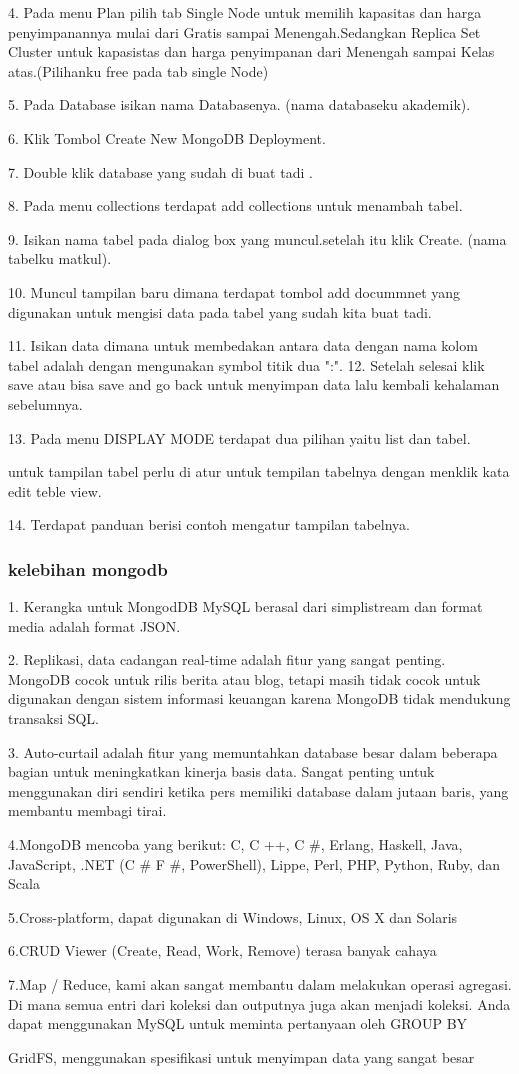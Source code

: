 4. Pada menu Plan pilih tab Single Node untuk memilih kapasitas dan harga penyimpanannya mulai dari Gratis sampai Menengah.Sedangkan Replica Set Cluster untuk kapasistas dan harga penyimpanan dari Menengah sampai Kelas atas.(Pilihanku free pada tab single Node)

5. Pada Database isikan nama Databasenya. (nama databaseku akademik).

6. Klik Tombol Create New MongoDB Deployment.

7. Double klik database yang sudah di buat tadi .

8. Pada menu collections terdapat add collections untuk menambah tabel.

9. Isikan nama tabel pada dialog box yang muncul.setelah itu klik Create. (nama tabelku matkul).

10. Muncul tampilan baru dimana terdapat tombol add docummnet yang digunakan untuk mengisi data pada tabel yang sudah kita buat tadi.

11. Isikan data dimana untuk membedakan antara data dengan nama kolom tabel adalah dengan mengunakan symbol titik dua ":".
12. Setelah selesai klik save atau bisa save and go back untuk menyimpan data lalu kembali kehalaman sebelumnya.

13. Pada menu DISPLAY MODE terdapat dua pilihan yaitu list dan tabel. 

untuk tampilan tabel perlu di atur untuk tempilan tabelnya dengan menklik kata edit teble view.

14. Terdapat panduan berisi contoh mengatur tampilan tabelnya.

\subsubsection {kelebihan mongodb}

1. Kerangka untuk MongodDB MySQL berasal dari simplistream dan format media adalah format JSON.

2. Replikasi, data cadangan real-time adalah fitur yang sangat penting. MongoDB cocok untuk rilis berita atau blog, tetapi masih tidak cocok untuk digunakan dengan sistem informasi keuangan karena MongoDB tidak mendukung transaksi SQL.

3. Auto-curtail adalah fitur yang memuntahkan database besar dalam beberapa bagian untuk meningkatkan kinerja basis data. Sangat penting untuk menggunakan diri sendiri ketika pers memiliki database dalam jutaan baris, yang membantu membagi tirai.

4.MongoDB mencoba yang berikut: C, C ++, C #, Erlang, Haskell, Java, JavaScript, .NET (C # F #, PowerShell), Lippe, Perl, PHP, Python, Ruby, dan Scala

5.Cross-platform, dapat digunakan di Windows, Linux, OS X dan Solaris

6.CRUD Viewer (Create, Read, Work, Remove) terasa banyak cahaya

7.Map / Reduce, kami akan sangat membantu dalam melakukan operasi agregasi. Di mana semua entri dari koleksi dan outputnya juga akan menjadi koleksi. Anda dapat menggunakan MySQL untuk meminta pertanyaan oleh GROUP BY

GridFS, menggunakan spesifikasi untuk menyimpan data yang sangat besar
